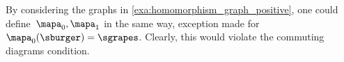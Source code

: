 \begin{example}[Counterexample]
    By considering the graphs in \cref{exa:homomorphism_graph_positive}, one could define~$\mapa_0,\mapa_1$ in the same way, exception made for~$\mapa_0(\sburger)=\sgrapes$.
    Clearly, this would violate the commuting diagrams condition.
\end{example}

\publictodomessage
{}
